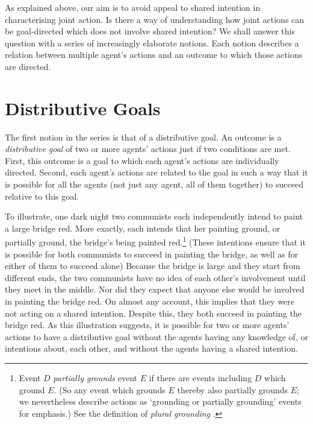 \documentclass[12pt,a4paper]{extarticle}
\begin{document}
As explained above, our aim is to avoid appeal to shared intention in characterising joint action.
Is there  a way of understanding how joint actions can be goal-directed which does not involve shared intention?
We shall answer this question with a series of increasingly elaborate notions.  
Each notion describes a relation between multiple agent's actions and an outcome to which those actions are directed.



\section{Distributive Goals}
\label{section_distributive}

The first notion in the series is that of a distributive goal.
An outcome is a \emph{distributive goal} of two or more agents' actions just if two conditions are met.
First, this outcome is a goal to which each agent's actions are individually directed.
Second, each agent's actions are related to the goal in such a way that it is possible for all the agents (not just any agent, all of them together) to succeed relative to this goal.

To illustrate, one dark night two communists each independently intend to paint a large bridge red.   
More exactly, each intends that her painting ground, or partially ground, the bridge's being painted red.\footnote{
Event $D$ \emph{partially grounds} event $E$ if there are events including $D$ which ground $E$.
(So any event which grounds $E$ thereby also partially grounds $E$; 
we nevertheless describe actions as `grounding or partially grounding' events for emphasis.)
See the definition of \emph{plural grounding} .
}  
(These intentions ensure that it is possible for both communists to succeed in painting the bridge, as well as for either of them to succeed alone)
Because the bridge is large and they start from different ends, the two communists have no idea of each other's involvement until they meet in the middle.
Nor did they expect that anyone else would be involved in painting the bridge red.  
On almost any account, this implies that they were not acting on a shared intention.
Despite this, 
they both succeed in painting the bridge red. 
As this illustration suggests, 
it is possible for two or more agents' actions to have a distributive goal without the agents having any knowledge of, or intentions about, each other, and without the agents having a shared intention.
\end{document}
